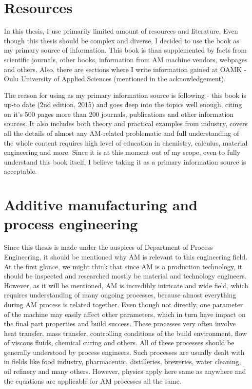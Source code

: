 \documentclass[a4paper, twoside, 11pt]{report}
\begin{document}
\section{Resources}
In this thesis, I use primarily limited amount of resources and literature. Even though this thesis should be complex and diverse, I decided to use the book \cite{AMT} as my primary source of information. This book is than supplemented by facts from scientific journals, other books, information from AM machine vendors, webpages and others. Also, there are sections where I write information gained at OAMK - Oulu University of Applied Sciences (mentioned in the acknowledgement).

	The reason for using \cite{AMT} as my primary information source is following - this book is up-to date (2nd edition, 2015) and goes deep into the topics well enough, citing on it's 500 pages more than 200 journals, publications and other information sources. It also includes both theory and practical examples from industry, covers all the details of almost any AM-related problematic and full understanding of the whole content requires high level of education in chemistry, calculus, material engineering and more. Since it is at this moment out of my scope, even to fully understand this book itself, I believe taking it as a primary information source is acceptable.
%
\section{Additive manufacturing and process engineering}
Since this thesis is made under the auspices of Department of Process Engineering, it should be mentioned why AM is relevant to this engineering field. At the first glance, we might think that since AM is a production technology, it should be inspected and researched mostly be material and technology engineers. However, as it will be mentioned, AM is incredibly intricate and wide field, which requires understanding of many ongoing processes, because almost everything during AM process is related together. Even though not directly, one parameter of the machine may easily affect other parameters, which in turn have impact on the final part properties and build success. These processes very often involve heat transfer, mass transfer, controlling conditions of the build environment, flow of viscous fluids, chemical curing and others. All of these processes should be generally understood by process engineers. Such processes are usually dealt with in fields like food industry, pharmaceutic, distilleries, breweries, water cleaning, oil refinery and many others. However, physics apply here same as anywhere and the equations are applicable for AM processes all the same.
\end{document}
